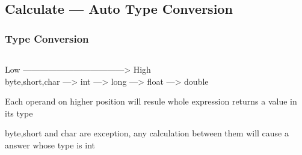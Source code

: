 \documentclass[en, 11pt, xcolor=dvipsnames]{beamer}
\begin{document}
\subsection{Calculate --- Auto Type Conversion}
\begin{frame}[fragile]
	\frametitle{Type Conversion}


	\begin{columns}[c]
		\begin{column}{0.9\textwidth}

			\begin{center}
				Low  ------------------------------------> High\\

				byte,short,char —> int —> long —> float —> double
			\end{center}

			\bigskip %

			Each operand on higher position will resule whole
			expression returns a value in its type

			byte,short and char are exception,
			any calculation between them will cause a answer whose type is int

		\end{column}
	\end{columns}

\end{frame}
\end{document}
